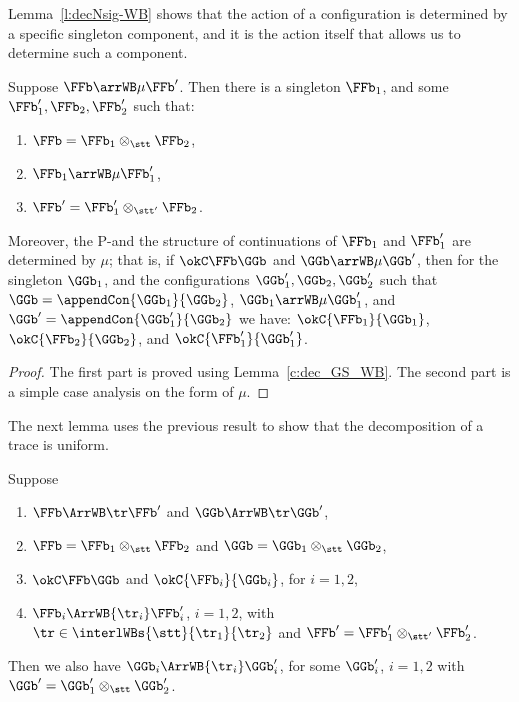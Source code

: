 \ifcutLMCS
Lemma~\ref{l:decNsig-WB} shows that the action of a configuration is 
determined by a specific singleton component, 
and it is the action itself that allows us to determine such a component.

\begin{lemma}
\label{l:decNsig-WB}
Suppose $\FFb \arrWB\mu \FFb'$.
Then there is a singleton $\FFb_1$, and some $\FFb_1',\FFb_2,\FFb_2'$ such that:

\begin{enumerate}
\item $\FFb =
 {\FFb_1} \otimes_{\stt} {\FFb_2}$,
\item $\FFb_1 \arrWB\mu \FFb_1'$,
\item $\FFb' =
 {\FFb_1'} \otimes_{\stt'} {\FFb_2}$.
\end{enumerate} 
 
Moreover, the P-\Supports and the structure of continuations of $\FFb_1$ and $\FFb_1'$  
are determined by 
$\mu$; that is, 
if  $\okC \FFb\GGb$ and
 $\GGb \arrWB\mu \GGb'$, then for  
 the singleton $\GGb_1$, and the configurations $\GGb_1',\GGb_2,\GGb_2'$ such that
 $\GGb = \appendCon
 {\GGb_1} {\GGb_2}$,
 $\GGb_1 \arrWB\mu \GGb_1'$, and 
 $\GGb' = \appendCon
 {\GGb_1'} {\GGb_2}$ we have: 
 $\okC{\FFb_1}{\GGb_1}$, $\okC{\FFb_2}{\GGb_2}$, and 
$\okC{\FFb_1'}{\GGb_1'}$.  
 \end{lemma} 



\begin{proof}
The first part is proved using Lemma~\ref{c:dec_GS_WB}. 
The second part is a simple case analysis on the form of $\mu$.
\end{proof} 

The next lemma uses the previous result to show that the decomposition of a trace 
is uniform.

\begin{lemma}
\label{l:decNsig2-WB}
Suppose 
\begin{enumerate}
\item
$\FFb \ArrWB \tr   \FFb'$
and $\GGb \ArrWB \tr   \GGb'$, 
\item  
 $\FFb = \FFb_1 \otimes_\stt \FFb_2$ and 
 $\GGb = \GGb_1 \otimes_\stt \GGb_2$,  
\item 
  $\okC \FFb\GGb$ and  
  $\okC {\FFb_i}{\GGb_i}$, for $i=1,2$,   
\item 
$\FFb_i \ArrWB{\tr_i}  \FFb_i'$, $i=1,2$,  with $\tr \in \interlWBs{\stt}{\tr_1}{\tr_2}$ and 
 $\FFb' = \FFb'_1 \otimes_{\stt'} \FFb'_2$.
\end{enumerate} 
Then we also have 
$\GGb_i \ArrWB{\tr_i}   \GGb_i'$, for some $\GGb_i'$, 
$i=1,2$ with 
 $\GGb' = \GGb'_1 \otimes_\stt \GGb'_2$.
\end{lemma} 



